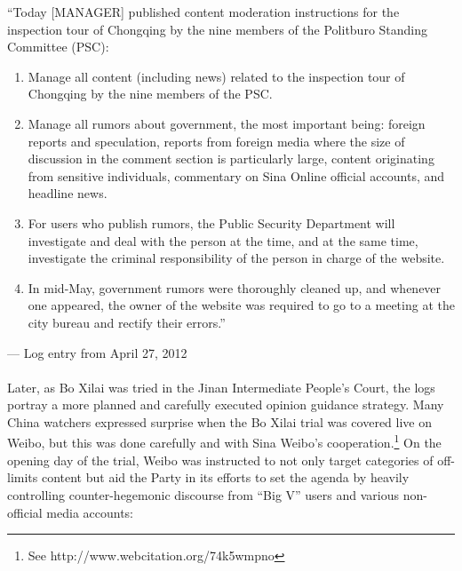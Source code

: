 \documentclass[12pt]{article}
\begin{document}
\begin{CJK*}{UTF8}{gbsn}
{
\epigraph{``Today [MANAGER] published content moderation instructions for the inspection tour of Chongqing by the nine members of the Politburo Standing Committee (PSC):
\begin{enumerate}[noitemsep]
\item Manage all content (including news) related to the inspection tour of Chongqing by the nine members of the PSC.
\item Manage all rumors about government, the most important being: foreign reports and speculation, reports from foreign media where the size of discussion in the comment section is particularly large, content originating from sensitive individuals, commentary on Sina Online official accounts, and headline news.
\item For users who publish rumors, the Public Security Department will investigate and deal with the person at the time, and at the same time, investigate the criminal responsibility of the person in charge of the website.
\item In mid-May, government rumors were thoroughly cleaned up, and whenever one appeared, the owner of the website was required to go to a meeting at the city bureau and rectify their errors.''\footnotemark
\end{enumerate}
\strut
}{--- Log entry from April 27, 2012}}

\paragraph{} Later, as Bo Xilai was tried in the Jinan Intermediate People's Court, the logs portray a more planned and carefully executed opinion guidance strategy. Many China watchers expressed surprise when the Bo Xilai trial was covered live on Weibo, but this was done carefully and with Sina Weibo's cooperation.\footnote{See http://www.webcitation.org/74k5wmpno} On the opening day of the trial, Weibo was instructed to not only target categories of off-limits content but aid the Party in its efforts to set the agenda by heavily controlling counter-hegemonic discourse from ``Big V'' users and various non-official media accounts:


\end{CJK*}
\end{document}

